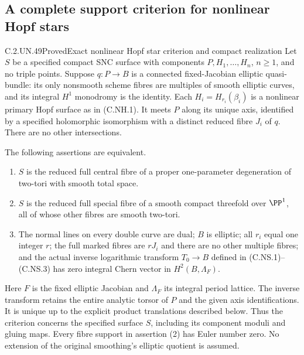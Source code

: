 \subsection{A complete support criterion for nonlinear Hopf stars}

\begin{statement}{C.2.UN.49}{Proved}{Exact nonlinear Hopf star criterion and compact realization}
Let $S$ be a specified compact SNC surface with components
$P,H_1,\ldots,H_n$, $n\ge1$, and no triple points. Suppose
$q:P\to B$ is a connected fixed-Jacobian elliptic quasi-bundle:
its only nonsmooth scheme fibres are multiples of smooth
elliptic curves, and its integral $H^1$ monodromy is the
identity. Each $H_i=H_{r_i}(\beta_i)$ is a nonlinear primary
Hopf surface as in (C.NH.1). It meets $P$ along its unique
axis, identified by a specified holomorphic isomorphism
with a distinct reduced fibre $J_i$ of $q$. There are no
other intersections.

The following assertions are equivalent.

\begin{enumerate}
\item $S$ is the reduced full central fibre of a proper
one-parameter degeneration of two-tori with smooth total space.
\item $S$ is the reduced full special fibre of a smooth compact
threefold over $\PP^1$, all of whose other fibres are smooth
two-tori.
\item The normal lines on every double curve are dual;
$B$ is elliptic; all $r_i$ equal one integer $r$; the full
marked fibres are $rJ_i$ and there are no other multiple
fibres; and the actual inverse logarithmic transform
$T_0\to B$ defined in (C.NS.1)--(C.NS.3) has zero integral
Chern vector in $H^2(B,\Lambda_F)$.
\end{enumerate}

Here $F$ is the fixed elliptic Jacobian and $\Lambda_F$ its
integral period lattice. The inverse transform retains
the entire analytic torsor of $P$ and the given axis
identifications. It is unique up to the explicit product
translations described below. Thus the criterion concerns
the specified surface $S$, including its component
moduli and gluing maps. Every fibre support in assertion
(2) has Euler number zero. No extension of the original
smoothing's elliptic quotient is assumed.
\end{statement}

